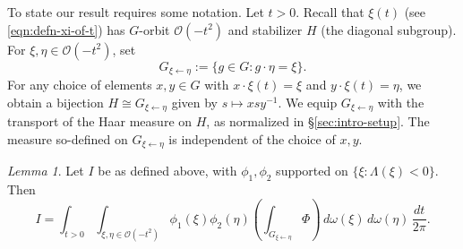 \documentclass[reqno,10pt]{amsart}
\theoremstyle{plain} %
\theoremstyle{definition}
\theoremstyle{plain} %
\theoremstyle{remark}
\theoremstyle{itplain} %
\newtheorem*{lemma*}{Lemma}
\theoremstyle{remark} %
\numberwithin{equation}{section}
\begin{document}
To state our result requires some notation.  Let $t > 0$.  Recall that $\xi(t)$ (see \eqref{eqn:defn-xi-of-t}) has $G$-orbit $\mathcal{O}(-t^2)$ and stabilizer $H$ (the diagonal subgroup).  For $\xi,\eta \in \mathcal{O}(-t^2)$, set
\[G_{\xi \leftarrow \eta} := \{g \in G : g \cdot \eta = \xi \}.\] For any choice of elements $x,y \in G$ with $x \cdot \xi(t) = \xi$ and $y \cdot \xi(t) = \eta$, we obtain a bijection $H \cong G_{\xi \leftarrow \eta}$ given by $s \mapsto x s y^{-1}$.  We equip $G_{\xi \leftarrow \eta}$ with the transport of the Haar measure on $H$, as normalized in \S\ref{sec:intro-setup}.  The measure so-defined on $G_{\xi \leftarrow \eta}$ is independent of the choice of $x,y$.
\begin{lemma*}
  Let $I$ be as defined above, with $\phi_1,\phi_2$ supported on $\{\xi : \Lambda(\xi) < 0\}$.  Then
  \begin{equation}
    I = \int_{t > 0}
    \int_{\xi,\eta \in \mathcal{O}(-t^2)}
    \phi_1(\xi) \phi_2(\eta)
    \left(\int_{G_{\xi \leftarrow \eta}} \Phi\right)
    \, d \omega (\xi ) \, d \omega (\eta )
    \, \frac{d t}{2 \pi }.
  \end{equation}
\end{lemma*}
\end{document}
